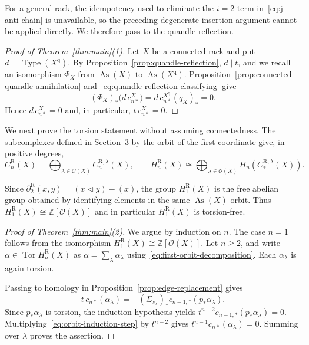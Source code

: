 \documentclass[10pt,a4paper]{amsart}
\DeclareMathOperator{\As}{As}
\DeclareMathOperator{\Tor}{Tor}
\DeclareMathOperator{\Type}{Type}
\newcommand{\ZZ}{\mathbb Z}
\newcommand{\OO}{\mathcal O}
\newcommand{\R}{\mathrm R}
\begin{document}
For a general rack, the idempotency used to eliminate the $i=2$ term in~\eqref{eq:j-anti-chain} is unavailable, so the preceding degenerate-insertion argument cannot be applied directly. We therefore pass to the quandle reflection.

\begin{proof}[Proof of Theorem~\ref{thm:main}(1)]
Let $X$ be a connected rack and put $d=\Type(X^{\mathrm q})$. By Proposition~\ref{prop:quandle-reflection}, $d\mid t$, and we recall an isomorphism $ \Phi_X$ from $\As(X)$ to $\As(X^{\mathrm q})$. Proposition~\ref{prop:connected-quandle-annihilation} and~\eqref{eq:quandle-reflection-classifying} give
\[
 (\Phi_X)_*\bigl(d\,c_{n*}^X\bigr)
 =d\,c_{n*}^{X^{\mathrm q}}(q_X)_*=0.
\]
Hence $d\,c_{n*}^X=0$ and, in particular, $t\,c_{n*}^X=0$.
\end{proof}

We next prove the torsion statement without assuming connectedness. The subcomplexes defined in Section~3 by the orbit of the first coordinate give, in positive degrees,
\begin{equation}
        C_n^\R(X)=
        \bigoplus_{\lambda\in\OO(X)}C_n^{\R,\lambda}(X),
        \qquad
        H_n^\R(X)\cong
        \bigoplus_{\lambda\in\OO(X)}
        H_n(C_*^{\R,\lambda}(X)).
\label{eq:first-orbit-decomposition}
\end{equation}

Since $\partial_2^\R(x,y)=(x\lhd y)-(x)$, the group $H_1^\R(X)$ is the free abelian group obtained by identifying elements in the same $\As(X)$-orbit. Thus
$  H_1^\R(X)\cong\ZZ[\OO(X)]$
and in particular $H_1^\R(X)$ is torsion-free.

\begin{proof}[Proof of Theorem~\ref{thm:main}(2)]
We argue by induction on $n$. The case $n=1$ follows from the isomorphism $  H_1^\R(X)\cong\ZZ[\OO(X)]$. Let $n\ge2$, and write $\alpha\in\Tor H_n^\R(X)$ as $\alpha=\sum_\lambda\alpha_\lambda$ using~\eqref{eq:first-orbit-decomposition}. Each $\alpha_\lambda$ is again torsion.

Passing to homology in Proposition~\ref{prop:edge-replacement} gives
\begin{equation}
 t\,c_{n*}(\alpha_\lambda)
 =-(\Sigma_{s_\lambda})_*c_{n-1,*}(p_*\alpha_\lambda).
 \label{eq:orbit-induction-step}
\end{equation}
Since $p_*\alpha_\lambda$ is torsion, the induction hypothesis yields
$t^{n-2}c_{n-1,*}(p_*\alpha_\lambda)=0$. Multiplying~\eqref{eq:orbit-induction-step} by $t^{n-2}$ gives $t^{n-1}c_{n*}(\alpha_\lambda)=0$. Summing over $\lambda$ proves the assertion.
\end{proof}
\end{document}
